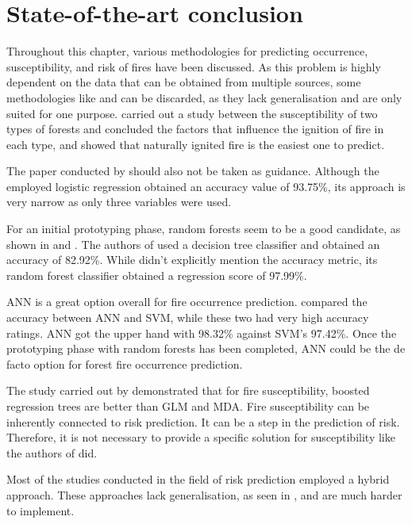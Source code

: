 \section{State-of-the-art conclusion}

Throughout this chapter, various methodologies for predicting occurrence, susceptibility, and risk of fires have been discussed. As this problem is highly dependent on the data that can be obtained from multiple sources, some methodologies like \cite{sadatrazavi2022predicting} and \cite{bountzouklis2023predicting} can be discarded, as they lack generalisation and are only suited for one purpose. \cite{sadatrazavi2022predicting} carried out a study between the susceptibility of two types of forests and concluded the factors that influence the ignition of fire in each type, and \cite{bountzouklis2023predicting} showed that naturally ignited fire is the easiest one to predict.


The paper conducted by \cite{10085661} should also not be taken as guidance. Although the employed logistic regression obtained an accuracy value of 93.75\%, its approach is very narrow as only three variables were used.


For an initial prototyping phase, random forests seem to be a good candidate, as shown in \cite{abid2020predicting} and \cite{9726029}. The authors of \cite{abid2020predicting} used a decision tree classifier and obtained an accuracy of 82.92\%. While \cite{9726029} didn't explicitly mention the accuracy metric, its random forest classifier obtained a regression score of 97.99\%.


ANN is a great option overall for fire occurrence prediction. \cite{SAYAD2019130} compared the accuracy between ANN and SVM, while these two had very high accuracy ratings. ANN got the upper hand with 98.32\% against SVM's 97.42\%. Once the prototyping phase with random forests has been completed, ANN could be the de facto option for forest fire occurrence prediction.


The study carried out by \cite{POURGHASEMI2020109321} demonstrated that for fire susceptibility, boosted regression trees are better than GLM and MDA. Fire susceptibility can be inherently connected to risk prediction. It can be a step in the prediction of risk. Therefore, it is not necessary to provide a specific solution for susceptibility like the authors of \cite{POURGHASEMI2020109321} did.


Most of the studies conducted in the field of risk prediction employed a hybrid approach. These approaches lack generalisation, as seen in \cite{ZHENG2020106772}, and are much harder to implement.



